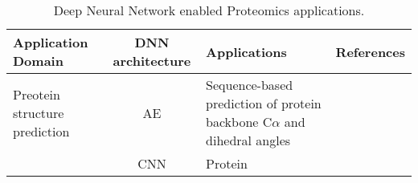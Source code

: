 \begin{table}[h!]
\centering
\begin{tabular}{|| l | c | l | l ||}
    \hline
    Application Domain & DNN architecture & Applications & References\\
    \hline \hline
    Preotein structure prediction & AE & Sequence-based prediction of protein backbone C$\alpha$ and dihedral angles & \\
    & CNN & Protein\\
    \hline
\end{tabular}
\caption{Deep Neural Network enabled Proteomics applications.}
\label{tab:PS-DNN}
\end{table}
